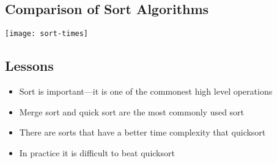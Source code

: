\begin{slide}
\section[-2]{Comparison of Sort Algorithms}

\begin{center}
  \texttt{[image: sort-times]}
\end{center}

\end{slide}



\begin{slide}
\section{Lessons}

\begin{PauseHighLight}
  \begin{itemize}
  \item Sort is important---it is one of the commonest high level
    operations\pause
  \item Merge sort and quick sort are the most commonly used sort\pause
  \item There are sorts that have a better time complexity that
    quicksort\pause
  \item In practice it is difficult to beat quicksort\pause
  \end{itemize}
\end{PauseHighLight}

\end{slide}
